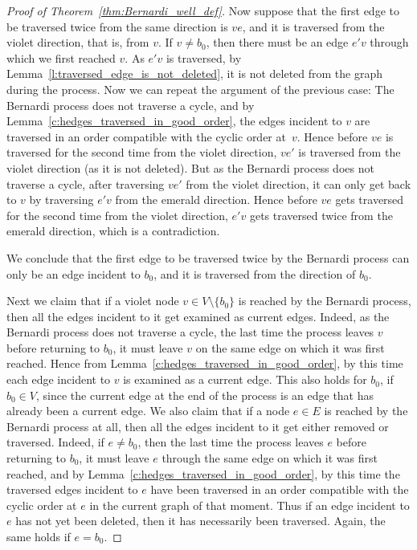 \documentclass[10pt]{amsart}
\theoremstyle{definition}\newtheorem{defi}[theo]{Definition}
\theoremstyle{remark}\newtheorem{rema}[theo]{Remark}
\begin{document}
\begin{proof}[Proof of Theorem~\ref{thm:Bernardi_well_def}]
Now suppose that the first edge to be traversed twice from the same direction is $ve$, and it is traversed from the violet direction, that is, from $v$. If $v\neq b_0$, then there must be an edge $e'v$ through which we first reached $v$. As $e'v$ is traversed, by Lemma~\ref{l:traversed_edge_is_not_deleted}, it is not deleted from the graph during the process. Now we can repeat the argument of the previous case: The Bernardi process does not traverse a cycle, and by Lemma~\ref{c:hedges_traversed_in_good_order}, the edges incident to $v$ are traversed in an order compatible with the cyclic order at~$v$. Hence before $ve$ is traversed for the second time from the violet direction, $ve'$ is traversed from the violet direction (as it is not deleted). But as the Bernardi process does not traverse a cycle, after traversing $ve'$ from the violet direction, it can only get back to $v$ by traversing $e'v$ from the emerald direction. Hence before $ve$ gets traversed for the second time from the violet direction, $e'v$ gets traversed twice from the emerald direction, which is a contradiction.

We conclude that the first edge to be traversed twice by the Bernardi process can only be an edge incident to $b_0$, and it is traversed from the direction of $b_0$.

Next we claim that if a violet node $v\in V\setminus\{b_0\}$ is reached by the Bernardi process, then all the edges incident to it get examined as current edges. Indeed, as the Bernardi process does not traverse a cycle, the last time the process leaves $v$ before returning to $b_0$, it must leave $v$ on the same edge on which it was first reached. Hence from Lemma~\ref{c:hedges_traversed_in_good_order}, by this time each edge incident to $v$ is examined as a current edge. This also holds for $b_0$, if $b_0\in V$, since the current edge at the end of the process is an edge that has already been a current edge. We also claim that if a node $e\in E$ is reached by the Bernardi process at all, then all the edges incident to it get either removed or traversed. Indeed, if $e\ne b_0$, then the last time the process leaves $e$ before returning to $b_0$, it must leave $e$ through the same edge on which it was first reached, and by Lemma~\ref{c:hedges_traversed_in_good_order}, by this time the traversed edges incident to $e$ have been traversed in an order compatible with the cyclic order at $e$ in the current graph of that moment. Thus if an edge incident to $e$ has not yet been deleted, then it has necessarily been traversed. Again, the same holds if $e=b_0$.


\end{proof}
\end{document}
